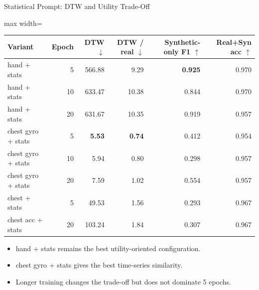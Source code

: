 \documentclass[aspectratio=169,11pt]{ctexbeamer}
\newcommand{\up}{\(\uparrow\)}
\newcommand{\down}{\(\downarrow\)}
\newcommand{\best}[1]{\textcolor{goodgreen}{\textbf{#1}}}
\begin{document}
\begin{frame}{Statistical Prompt: DTW and Utility Trade-Off}
\small
\begin{adjustbox}{max width=\textwidth}
\begin{tabular}{lrrrrr}
\toprule
Variant & Epoch & DTW \down & DTW / real \down & Synthetic-only F1 \up & Real+Syn acc \up \\
\midrule
hand + stats & 5 & 566.88 & 9.29 & \best{0.925} & 0.970 \\
hand + stats & 10 & 633.47 & 10.38 & 0.844 & 0.970 \\
hand + stats & 20 & 631.67 & 10.35 & 0.919 & 0.957 \\
chest gyro + stats & 5 & \best{5.53} & \best{0.74} & 0.412 & 0.954 \\
chest gyro + stats & 10 & 5.94 & 0.80 & 0.298 & 0.957 \\
chest gyro + stats & 20 & 7.59 & 1.02 & 0.554 & 0.957 \\
chest + stats & 5 & 49.53 & 1.56 & 0.293 & 0.967 \\
chest acc + stats & 20 & 103.24 & 1.84 & 0.307 & 0.967 \\
\bottomrule
\end{tabular}
\end{adjustbox}
\vspace{0.5em}
\begin{itemize}
  \item hand + stats remains the best utility-oriented configuration.
  \item chest gyro + stats gives the best time-series similarity.
  \item Longer training changes the trade-off but does not dominate 5 epochs.
\end{itemize}
\end{frame}
\end{document}
